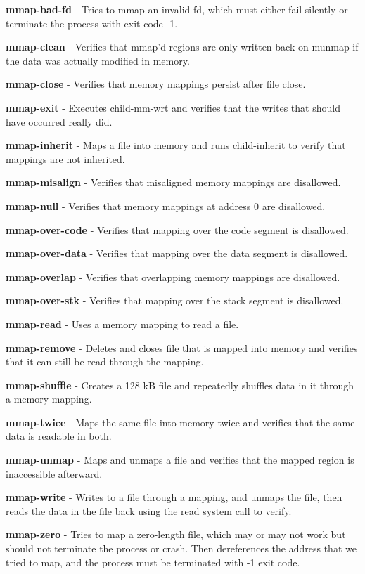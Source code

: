 \textbf{mmap-bad-fd} - Tries to mmap an invalid fd, which must either fail silently or terminate the process with exit code -1.


\textbf{mmap-clean} - Verifies that mmap'd regions are only written back on munmap if the data was actually modified in memory.


\textbf{mmap-close} - Verifies that memory mappings persist after file close.


\textbf{mmap-exit} - Executes child-mm-wrt and verifies that the writes that should  have occurred really did.


\textbf{mmap-inherit} - Maps a file into memory and runs child-inherit to verify that  mappings are not inherited.


\textbf{mmap-misalign} - Verifies that misaligned memory mappings are disallowed.


\textbf{mmap-null} - Verifies that memory mappings at address 0 are disallowed.


\textbf{mmap-over-code} - Verifies that mapping over the code segment is disallowed.


\textbf{mmap-over-data} - Verifies that mapping over the data segment is disallowed.


\textbf{mmap-overlap} - Verifies that overlapping memory mappings are disallowed.


\textbf{mmap-over-stk} - Verifies that mapping over the stack segment is disallowed.


\textbf{mmap-read} - Uses a memory mapping to read a file.


\textbf{mmap-remove} - Deletes and closes file that is mapped into memory and verifies that it can still be read through the mapping.


\textbf{mmap-shuffle} - Creates a 128 kB file and repeatedly shuffles data in it through a memory mapping.


\textbf{mmap-twice} - Maps the same file into memory twice and verifies that the same data is readable in both.


\textbf{mmap-unmap} - Maps and unmaps a file and verifies that the mapped region is inaccessible afterward.


\textbf{mmap-write} - Writes to a file through a mapping, and unmaps the file, then reads the data in the file back using the read system call to verify.


\textbf{mmap-zero} - Tries to map a zero-length file, which may or may not work but  should not terminate the process or crash.  Then dereferences the address that we tried to map, and the process must be terminated with -1 exit code. 









	

